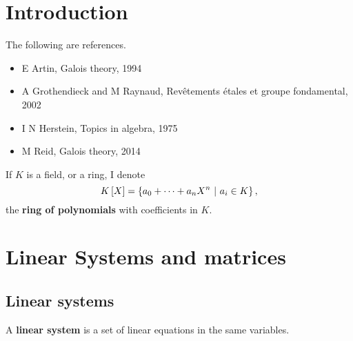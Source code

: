 






\section{Introduction}


The following are references.
\begin{itemize}
\item E Artin, Galois theory, 1994
\item A Grothendieck and M Raynaud, Rev\^etements \'etales et groupe fondamental, 2002
\item I N Herstein, Topics in algebra, 1975
\item M Reid, Galois theory, 2014
\end{itemize}

\begin{notation*}
If $ K $ is a field, or a ring, I denote
$$ K\sbr{X} = \cbr{a_0 + \dots + a_nX^n \st a_i \in K}, $$
the \textbf{ring of polynomials} with coefficients in $ K $.
\end{notation*}

\section{Linear Systems and matrices}
\subsection{Linear systems}
\begin{definition}
    A \textbf{linear system} is a set of linear equations in the same variables.
\end{definition}

